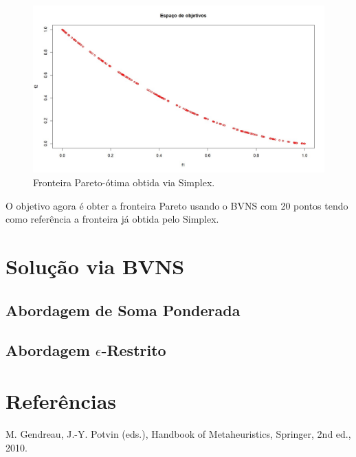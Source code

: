 \documentclass[
	12pt,				%
	oneside,			%
	a4paper,			%
	chapter=TITLE,
	sumario=tradicional,
	english,			%
	brazil				%
]{abntex2}
\begin{document}
\begin{figure}[h!]
	\caption{\label{fig:simplex_tc2}Fronteira Pareto-ótima obtida via Simplex.}
	\begin{center}
    \includegraphics[width=\textwidth,trim=1 1 1 1,clip]{simplex_tc2.png}
	\end{center}
\end{figure}

O objetivo agora é obter a fronteira Pareto usando o BVNS com 20 pontos
tendo como referência a 
fronteira já obtida pelo Simplex.

\chapter{Solução via BVNS}\label{cap:bnvs} 

\section{Abordagem de Soma Ponderada}

\section{Abordagem $\epsilon$-Restrito}


\chapter{Referências}\label{cap:referencias} 

\noindent M. Gendreau, J.-Y. Potvin (eds.), Handbook of Metaheuristics, Springer, 2nd ed., 2010.
\end{document}
